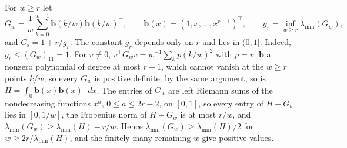 For $w\ge r$ let
\[
G_w=\frac1w\sum_{k=0}^{w-1}\mathbf b(k/w)\mathbf b(k/w)^\top,\qquad \mathbf b(x)=(1,x,\dots,x^{r-1})^\top,\qquad g_r=\inf_{w\ge r}\lambda_{\min}(G_w),
\]
and $C_s=1+r/g_r$. The constant $g_r$ depends only on $r$ and lies in $(0,1]$. Indeed, $g_r\le(G_w)_{11}=1$. For $v\ne0$, $v^\top G_wv=w^{-1}\sum_kp(k/w)^2$ with $p=v^\top\mathbf b$ a nonzero polynomial of degree at most $r-1$, which cannot vanish at the $w\ge r$ points $k/w$, so every $G_w$ is positive definite; by the same argument, so is $H=\int_0^1\mathbf b(x)\mathbf b(x)^\top dx$. The entries of $G_w$ are left Riemann sums of the nondecreasing functions $x^{a}$, $0\le a\le 2r-2$, on $[0,1]$, so every entry of $H-G_w$ lies in $[0,1/w]$, the Frobenius norm of $H-G_w$ is at most $r/w$, and $\lambda_{\min}(G_w)\ge\lambda_{\min}(H)-r/w$. Hence $\lambda_{\min}(G_w)\ge\lambda_{\min}(H)/2$ for $w\ge2r/\lambda_{\min}(H)$, and the finitely many remaining $w$ give positive values.
